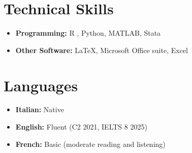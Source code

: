 \documentclass[11pt,a4paper]{article}
\begin{document}


\section{Technical Skills}

\begin{itemize}[leftmargin=0em]
    \item \textbf{Programming:} R 
    , Python, MATLAB, Stata
    \item \textbf{Other Software:} LaTeX, Microsoft Office suite, Excel
\end{itemize}

\section{Languages}
\begin{itemize}[leftmargin=0em]
	\item \textbf{Italian:} Native
	\item \textbf{English:} Fluent (C2 2021, IELTS 8 2025)
	\item \textbf{French:} Basic (moderate reading and listening)
\end{itemize}
\end{document}
